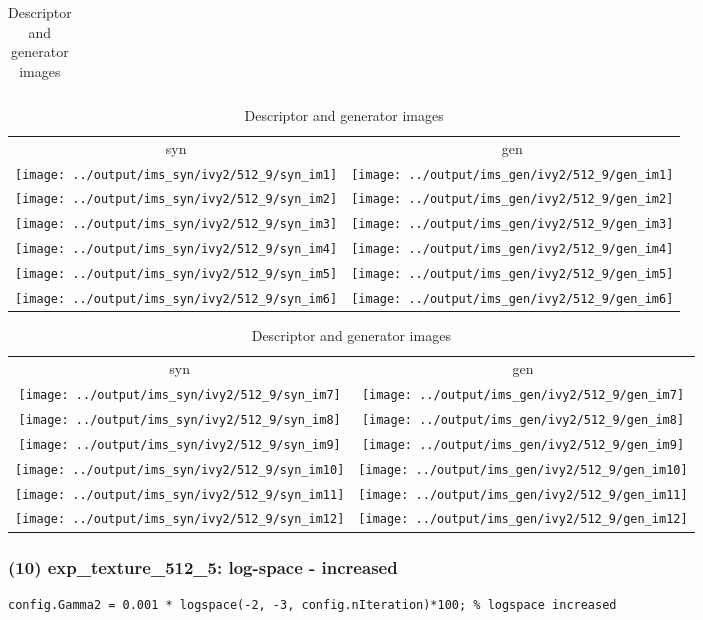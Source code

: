 \documentclass[letter]{article}
\begin{document}
\begin{table}[h!]
\begin{tabular}{c}
	\end{tabular}
	\begin{tabular}{cc}
		syn & gen\tabularnewline
		\texttt{[image: ../output/ims\_syn/ivy2/512\_9/syn\_im1]} & \texttt{[image: ../output/ims\_gen/ivy2/512\_9/gen\_im1]} \tabularnewline
		\texttt{[image: ../output/ims\_syn/ivy2/512\_9/syn\_im2]} & \texttt{[image: ../output/ims\_gen/ivy2/512\_9/gen\_im2]} \tabularnewline
		\texttt{[image: ../output/ims\_syn/ivy2/512\_9/syn\_im3]} & \texttt{[image: ../output/ims\_gen/ivy2/512\_9/gen\_im3]} \tabularnewline
		\texttt{[image: ../output/ims\_syn/ivy2/512\_9/syn\_im4]} & \texttt{[image: ../output/ims\_gen/ivy2/512\_9/gen\_im4]} \tabularnewline
		\texttt{[image: ../output/ims\_syn/ivy2/512\_9/syn\_im5]} & \texttt{[image: ../output/ims\_gen/ivy2/512\_9/gen\_im5]} \tabularnewline
		\texttt{[image: ../output/ims\_syn/ivy2/512\_9/syn\_im6]} & \texttt{[image: ../output/ims\_gen/ivy2/512\_9/gen\_im6]} \tabularnewline
	\end{tabular}
	\begin{tabular}{cc}
		syn & gen\tabularnewline
		\texttt{[image: ../output/ims\_syn/ivy2/512\_9/syn\_im7]} & \texttt{[image: ../output/ims\_gen/ivy2/512\_9/gen\_im7]} \tabularnewline
		\texttt{[image: ../output/ims\_syn/ivy2/512\_9/syn\_im8]} & \texttt{[image: ../output/ims\_gen/ivy2/512\_9/gen\_im8]} \tabularnewline
		\texttt{[image: ../output/ims\_syn/ivy2/512\_9/syn\_im9]} & \texttt{[image: ../output/ims\_gen/ivy2/512\_9/gen\_im9]} \tabularnewline
		\texttt{[image: ../output/ims\_syn/ivy2/512\_9/syn\_im10]} & \texttt{[image: ../output/ims\_gen/ivy2/512\_9/gen\_im10]} \tabularnewline
		\texttt{[image: ../output/ims\_syn/ivy2/512\_9/syn\_im11]} & \texttt{[image: ../output/ims\_gen/ivy2/512\_9/gen\_im11]} \tabularnewline
		\texttt{[image: ../output/ims\_syn/ivy2/512\_9/syn\_im12]} & \texttt{[image: ../output/ims\_gen/ivy2/512\_9/gen\_im12]} \tabularnewline
	\end{tabular}
	\caption{Descriptor and generator images}
\end{table}
\newpage

\subsubsection*{(10) exp\_texture\_512\_5: log-space - increased}

\begin{lstlisting}
config.Gamma2 = 0.001 * logspace(-2, -3, config.nIteration)*100; % logspace increased
\end{lstlisting}
\end{document}
